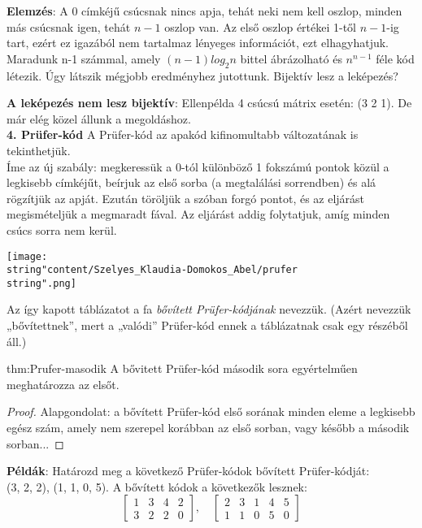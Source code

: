 \begin{solution}
\textbf{Elemzés}: A 0 címkéjű csúcsnak nincs apja, tehát neki nem
kell oszlop, minden más csúcsnak igen, tehát $n-1$ oszlop van. Az
első oszlop értékei 1-től $n-1$-ig tart, ezért ez igazából nem tartalmaz
lényeges információt, ezt elhagyhatjuk. Maradunk n-1 számmal, amely
$(n-1)log_{2}n$ bittel ábrázolható és $n^{n-1}$ féle kód létezik.
Úgy látszik mégjobb eredményhez jutottunk. Bijektív lesz a leképezés?

\textbf{A leképezés nem lesz bijektív}: Ellenpélda 4 csúcsú mátrix
esetén: (3 2 1). De már elég közel állunk a megoldáshoz.\\

\textbf{4. Prüfer-kód} A Prüfer-kód az apakód kifinomultabb változatának
is tekinthetjük.\\

Íme az új szabály: megkeressük a 0-tól különböző 1 fokszámú pontok
közül a legkisebb címkéjűt, beírjuk az első sorba (a megtalálási sorrendben)
és alá rögzítjük az apját. Ezután töröljük a szóban forgó pontot,
és az eljárást megismételjük a megmaradt fával. Az eljárást addig
folytatjuk, amíg minden csúcs sorra nem kerül.
\begin{center}
	\texttt{[image: \\string"content/Szelyes\_Klaudia-Domokos\_Abel/prufer\\string".png]} 
	\par\end{center}

Az így kapott táblázatot a fa \emph{bővített Prüfer-kódjának} nevezzük.
(Azért nevezzük „bővítettnek”, mert a „valódi” Prüfer-kód ennek a
táblázatnak csak egy részéből áll.)
\begin{theorem}{thm:Prufer-masodik}
	A bővitett Prüfer-kód második sora egyértelműen meghatározza az elsőt. 
\end{theorem}

\begin{proof}
	Alapgondolat: a bővített Prüfer-kód első sorának minden eleme a legkisebb
	egész szám, amely nem szerepel korábban az első sorban, vagy később
	a második sorban... 
\end{proof}
\textbf{Példák}: Határozd meg a következő Prüfer-kódok bővített Prüfer-kódját:\\
(3, 2, 2), (1, 1, 0, 5). A bővített kódok a következők lesznek: 
\[
\begin{bmatrix}1 & 3 & 4 & 2\\
	3 & 2 & 2 & 0
\end{bmatrix},\quad\begin{bmatrix}2 & 3 & 1 & 4 & 5\\
	1 & 1 & 0 & 5 & 0
\end{bmatrix}
\]


\end{solution}

